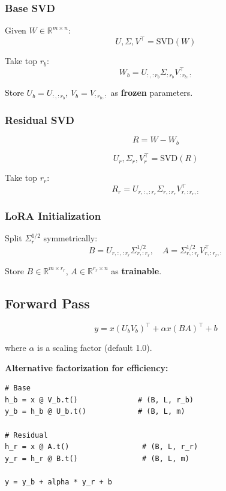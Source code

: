 \subsubsection{Base SVD}

Given $W \in \mathbb{R}^{m \times n}$:
\[
U, \Sigma, V^\top = \text{SVD}(W)
\tag{4.1}
\]

Take top $r_b$:
\[
W_b = U_{:, :r_b} \Sigma_{:r_b} V_{:r_b, :}^\top
\tag{4.2}
\]

Store $U_b = U_{:, :r_b}$, $V_b = V_{:r_b, :}$ as \textbf{frozen} parameters.

\subsubsection{Residual SVD}

\[
R = W - W_b
\tag{4.3}
\]

\[
U_r, \Sigma_r, V_r^\top = \text{SVD}(R)
\tag{4.4}
\]

Take top $r_r$:
\[
R_r = U_{r, :, :r_r} \Sigma_{r, :r_r} V_{r, :r_r, :}^\top
\tag{4.5}
\]

\subsubsection{LoRA Initialization}

Split $\Sigma_r^{1/2}$ symmetrically:
\[
B = U_{r, :, :r_r} \Sigma_{r, :r_r}^{1/2}, \quad
A = \Sigma_{r, :r_r}^{1/2} V_{r, :r_r, :}^\top
\tag{4.6}
\]

Store $B \in \mathbb{R}^{m \times r_r}$, $A \in \mathbb{R}^{r_r \times n}$ as 
\textbf{trainable}.

\subsection{Forward Pass}

\[
y = x (U_b V_b)^\top + \alpha x (B A)^\top + b
\tag{4.7}
\]

where $\alpha$ is a scaling factor (default 1.0).

\textbf{Alternative factorization for efficiency:}
\begin{lstlisting}
# Base
h_b = x @ V_b.t()              # (B, L, r_b)
y_b = h_b @ U_b.t()            # (B, L, m)

# Residual
h_r = x @ A.t()                 # (B, L, r_r)
y_r = h_r @ B.t()               # (B, L, m)

y = y_b + alpha * y_r + b
\end{lstlisting}

